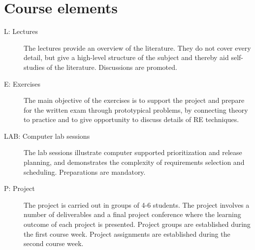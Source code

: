\documentclass[10pt,a4paper]{article}
\begin{document}
\newpage

\section{Course elements}
\begin{description}
\item[L: Lectures] The lectures provide an overview of the literature. They do not cover every detail, but give a high-level structure of the subject and thereby aid self-studies of the literature. Discussions are promoted.
\item[E: Exercises] The main objective of the exercises is to support the project and prepare for the written exam through prototypical problems, by connecting theory to practice and to give opportunity to discuss details of RE techniques.
\item[LAB: Computer lab sessions] The lab sessions illustrate computer supported
prioritization and release planning, and demonstrates the complexity of requirements selection and scheduling. Preparations are mandatory. 
\item[P: Project] The project is carried out in groups of 4-6 students. The project involves a number of deliverables and a final project conference where the learning outcome of each project is presented. Project groups are established during the first course week. Project assignments are established during the second course week.
\end{description}
\end{document}
